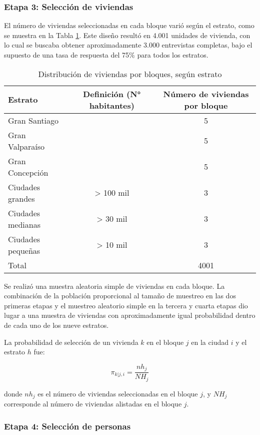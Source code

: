 \documentclass[
  12pt,
]{article}
\begin{document}
\hypertarget{etapa3m1}{%
\subsubsection*{Etapa 3: Selección de viviendas}\label{etapa3m1}}

El número de viviendas seleccionadas en cada bloque varió según el estrato, como se muestra en la Tabla \ref{tab:bloques}. Este diseño resultó en 4.001 unidades de vivienda, con lo cual se buscaba obtener aproximadamente 3.000 entrevistas completas, bajo el supuesto de una tasa de respuesta del 75\% para todos los estratos.

\begin{table}[H]

\caption{\label{tab:bloques}Distribución de viviendas por bloques, según estrato}
\centering
\begin{tabular}[t]{lcc}
\toprule
Estrato & Definición (N° habitantes) & Número de viviendas por bloque\\
\midrule
Gran Santiago &  & 5\\
Gran Valparaíso &  & 5\\
Gran Concepción &  & 5\\
Ciudades grandes & > 100 mil & 3\\
Ciudades medianas & > 30 mil & 3\\
\addlinespace
Ciudades pequeñas & > 10 mil & 3\\
Total &  & 4001\\
\bottomrule
\end{tabular}
\end{table}

Se realizó una muestra aleatoria simple de viviendas en cada bloque. La combinación de la población proporcional al tamaño de muestreo en las dos primeras etapas y el muestreo aleatorio simple en la tercera y cuarta etapas dio lugar a una muestra de viviendas con aproximadamente igual probabilidad dentro de cada uno de los nueve estratos.

La probabilidad de selección de un vivienda \(k\) en el bloque \(j\) en la ciudad \(i\) y el estrato \(h\) fue:

\[\pi_{k|j,i}=\frac{nh_j}{NH_j}\]

donde \(nh_j\) es el número de viviendas seleccionadas en el bloque \(j\), y \(NH_j\) corresponde al número de viviendas alistadas en el bloque \(j\).

\hypertarget{etapa4m1}{%
\subsubsection*{Etapa 4: Selección de personas}\label{etapa4m1}}
\end{document}
